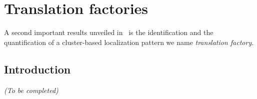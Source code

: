 


\section{Translation factories}
\label{sec:translation_factories}

A second important results unveiled in~\cite{CHOUAIB_2020} is the identification and the quantification of a cluster-based localization pattern we name \emph{translation factory}.

\subsection{Introduction}
\label{subsec:introduction_translation_factories}

\begin{center}
	\textit{(To be completed)}
\end{center}

